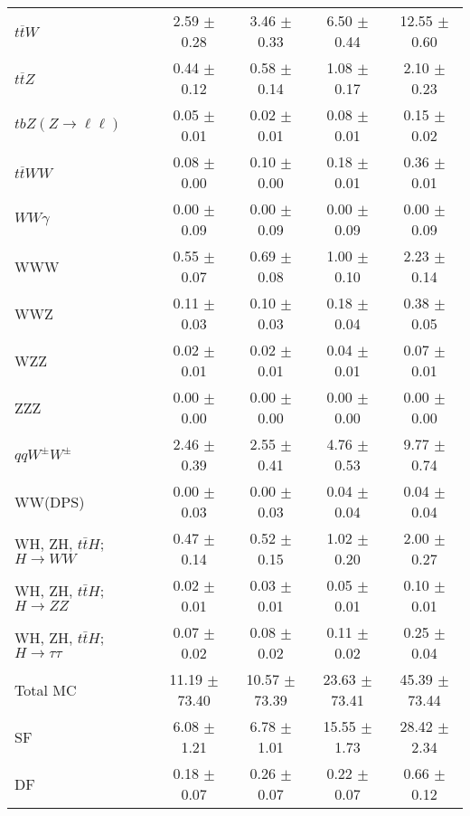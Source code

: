 \begin{tabular}{l|cccc}
                   $t\overline{t}W$ &  2.59 $\pm$  0.28 &  3.46 $\pm$  0.33 &  6.50 $\pm$  0.44 & 12.55 $\pm$  0.60 \\
                   $t\overline{t}Z$ &  0.44 $\pm$  0.12 &  0.58 $\pm$  0.14 &  1.08 $\pm$  0.17 &  2.10 $\pm$  0.23 \\
    $tbZ (Z \rightarrow \ell \ell)$ &  0.05 $\pm$  0.01 &  0.02 $\pm$  0.01 &  0.08 $\pm$  0.01 &  0.15 $\pm$  0.02 \\
                  $t\overline{t}WW$ &  0.08 $\pm$  0.00 &  0.10 $\pm$  0.00 &  0.18 $\pm$  0.01 &  0.36 $\pm$  0.01 \\
                         $WW\gamma$ &  0.00 $\pm$  0.09 &  0.00 $\pm$  0.09 &  0.00 $\pm$  0.09 &  0.00 $\pm$  0.09 \\
                                WWW &  0.55 $\pm$  0.07 &  0.69 $\pm$  0.08 &  1.00 $\pm$  0.10 &  2.23 $\pm$  0.14 \\
                                WWZ &  0.11 $\pm$  0.03 &  0.10 $\pm$  0.03 &  0.18 $\pm$  0.04 &  0.38 $\pm$  0.05 \\
                                WZZ &  0.02 $\pm$  0.01 &  0.02 $\pm$  0.01 &  0.04 $\pm$  0.01 &  0.07 $\pm$  0.01 \\
                                ZZZ &  0.00 $\pm$  0.00 &  0.00 $\pm$  0.00 &  0.00 $\pm$  0.00 &  0.00 $\pm$  0.00 \\
                 $qqW^{\pm}W^{\pm}$ &  2.46 $\pm$  0.39 &  2.55 $\pm$  0.41 &  4.76 $\pm$  0.53 &  9.77 $\pm$  0.74 \\
                            WW(DPS) &  0.00 $\pm$  0.03 &  0.00 $\pm$  0.03 &  0.04 $\pm$  0.04 &  0.04 $\pm$  0.04 \\
WH, ZH, $t\bar{t}H$; $H \rightarrow WW$ &  0.47 $\pm$  0.14 &  0.52 $\pm$  0.15 &  1.02 $\pm$  0.20 &  2.00 $\pm$  0.27 \\
WH, ZH, $t\bar{t}H$; $H \rightarrow ZZ$ &  0.02 $\pm$  0.01 &  0.03 $\pm$  0.01 &  0.05 $\pm$  0.01 &  0.10 $\pm$  0.01 \\
WH, ZH, $t\bar{t}H$; $H \rightarrow \tau\tau$ &  0.07 $\pm$  0.02 &  0.08 $\pm$  0.02 &  0.11 $\pm$  0.02 &  0.25 $\pm$  0.04 \\
\hline\hline
                           Total MC & 11.19 $\pm$ 73.40 & 10.57 $\pm$ 73.39 & 23.63 $\pm$ 73.41 & 45.39 $\pm$ 73.44 \\
\hline
                                 SF &  6.08 $\pm$  1.21 &  6.78 $\pm$  1.01 & 15.55 $\pm$  1.73 & 28.42 $\pm$  2.34 \\
                                 DF &  0.18 $\pm$  0.07 &  0.26 $\pm$  0.07 &  0.22 $\pm$  0.07 &  0.66 $\pm$  0.12 \\

\end{tabular}
